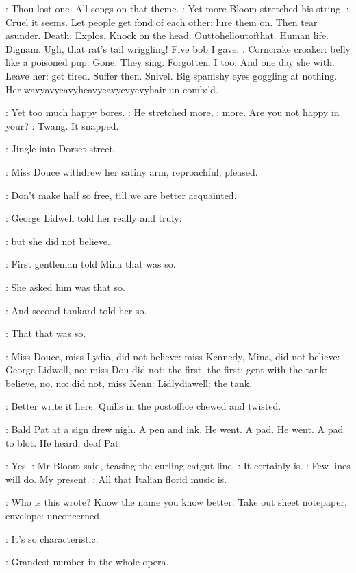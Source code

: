 \BloomInt:
Thou lost one.
All songs on that theme.
:
Yet more Bloom stretched his string.
\BloomInt:
Cruel it seems.
Let people get fond of each other:
lure them on.
Then tear asunder.
Death.
Explos.
Knock on the head.
Outtohelloutofthat.
Human life.
Dignam.
Ugh,
that rat's tail wriggling!
Five bob I gave.
.
Corncrake croaker:
belly like a poisoned pup.
Gone.
They sing.
Forgotten.
I too; And one day she with.
Leave her:
get tired.
Suffer then.
Snivel.
Big spanishy eyes goggling at nothing.
Her
wavyavyeavyheavyeavyevyevyhair un comb:'d.

\BloomInt:
Yet too much happy bores.
:
He stretched more,
\BloomInt:
more.
Are you not happy in your?
:
Twang.
It snapped.

:
Jingle into Dorset street.

:
Miss Douce withdrew her satiny arm,
reproachful,
pleased.

\MissD:
Don't make half so free,
till we are better acquainted.

:
George Lidwell told her really and truly:

:
but she did not believe.

:
First gentleman told Mina that was so.

:
She asked him was that so.

:
And second tankard told her so.

:
That that was so.

:
Miss Douce,
miss Lydia,
did not believe:
miss Kennedy,
Mina,
did not
believe:
George Lidwell,
no:
miss Dou did not:
the first,
the first:
gent
with the tank:
believe,
no,
no:
did not,
miss Kenn:
Lidlydiawell:
the
tank.

\BloomInt:
Better write it here.
Quills in the postoffice chewed and twisted.

:
Bald Pat at a sign drew nigh.
A pen and ink.
He went.
A pad.
He
went.
A pad to blot.
He heard,
deaf Pat.

\Bloom:
Yes.
:
Mr Bloom said,
teasing the curling catgut line.
\Bloom:
It certainly is.
\BloomInt:
Few lines will do.
My present.
\Bloom:
All that Italian florid music is.

\BloomInt:
Who is this wrote?
Know the name you know better.
Take out sheet notepaper,
envelope:
unconcerned.

\Bloom:
It's so characteristic.

\goulding:
Grandest number in the whole opera.

